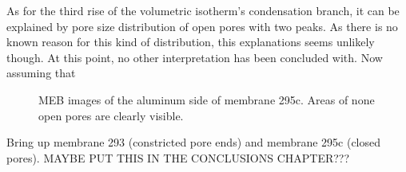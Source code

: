 \documentclass[../thesis.tex]{subfiles}
\begin{document}
        As for the third rise of the volumetric isotherm's condensation branch, it can be explained by pore size distribution of open pores with two peaks. As there is no known reason for this kind of distribution, this explanations seems unlikely though. At this point, no other interpretation has been concluded with.
        \medskip
        Now assuming that



        \begin{figure}[htpb]
          \hfill
          \caption{MEB images of the aluminum side of membrane 295c. Areas of none open pores are clearly visible.}
          \label{fig:295c-meb}
        \end{figure}

      \medskip

      Bring up membrane 293 (constricted pore ends) and membrane 295c (closed pores).
      MAYBE PUT THIS IN THE CONCLUSIONS CHAPTER???
\end{document}
